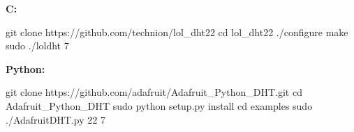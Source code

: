 \textbf{C:}

\begin{console}
git clone https://github.com/technion/lol_dht22
cd lol_dht22
./configure
make
sudo ./loldht 7
\end{console}

\textbf{Python:}

\begin{console}
git clone https://github.com/adafruit/Adafruit_Python_DHT.git
cd Adafruit_Python_DHT
sudo python setup.py install
cd examples
sudo ./AdafruitDHT.py 22 7
\end{console}
